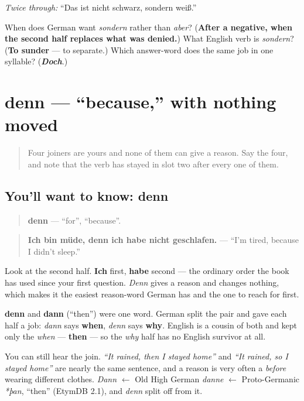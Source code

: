 \emph{Twice through:} \textquotedblleft{}Das ist nicht schwarz, sondern weiß.\textquotedblright{}

\begin{tcolorbox}[breakable,colback=teal!4,colframe=teal!35!black,title={Before you move on}]
When does German want \emph{sondern} rather than \emph{aber}? (\textbf{After a negative, when the second half replaces what was denied.}) What English verb is \emph{sondern}? (\textbf{To sunder} — to separate.) Which answer-word does the same job in one syllable? (\emph{\textbf{Doch}}.)
\end{tcolorbox}
\section[denn]{denn — \textquotedblleft{}because,\textquotedblright{} with nothing moved}

\label{lesson:GE-C35-denn}



\begin{quote}
Four joiners are yours and none of them can give a reason. Say the four, and note that the verb has stayed in slot two after every one of them.
\end{quote}

\subsection*{You'll want to know: denn}
\begin{quote}
\textbf{denn} — \textquotedblleft{}for\textquotedblright{}, \textquotedblleft{}because\textquotedblright{}.
\end{quote}

\begin{quote}
\textbf{Ich bin müde, denn ich habe nicht geschlafen.} — \textquotedblleft{}I'm tired, because I didn't sleep.\textquotedblright{}
\end{quote}

Look at the second half. \textbf{Ich} first, \textbf{habe} second — the ordinary order the book has used since your first question. \emph{Denn} gives a reason and changes nothing, which makes it the easiest reason-word German has and the one to reach for first.

\begin{cousinweb}
\textbf{denn} and \textbf{dann} (\textquotedblleft{}then\textquotedblright{}) were one word. German split the pair and gave each half a job: \emph{dann} says \textbf{when}, \emph{denn} says \textbf{why}. English is a cousin of both and kept only the \emph{when} — \textbf{then} — so the \emph{why} half has no English survivor at all.

You can still hear the join. \emph{\textquotedblleft{}It rained, then I stayed home\textquotedblright{}} and \emph{\textquotedblleft{}It rained, so I stayed home\textquotedblright{}} are nearly the same sentence, and a reason is very often a \emph{before} wearing different clothes. \emph{Dann} $\leftarrow$ Old High German \emph{danne} $\leftarrow$ Proto-Germanic \emph{*þan}, \textquotedblleft{}then\textquotedblright{} (EtymDB 2.1), and \emph{denn} split off from it.
\end{cousinweb}

